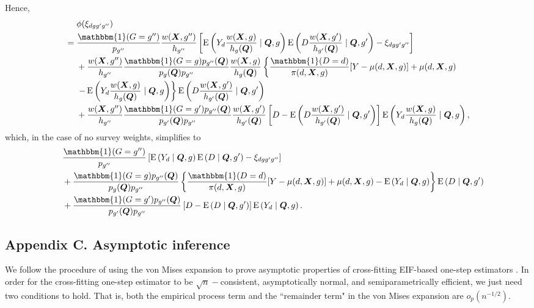 \documentclass[12pt,a4paper]{article}
\newcommand{\E}{\operatorname{E}}
\def\X{{\boldsymbol X}}
\def\Q{{\boldsymbol Q}}
\def\one{\mathbbm{1}}
\begin{document}
Hence,
\begin{align*}
    &\phantom{{}={}} \phi(\xi_{dgg'g''}) \\
    &= \frac{\one(G=g'')}{p_{g''}}\frac{w(\X,g'')}{h_{g''}} \left[ \E \left(Y_d \frac{w(\X,g)}{h_{g}(\Q)}  \mid \Q, g \right) \E \left(D \frac{w(\X,g')}{h_{g'}(\Q)} \mid \Q, g' \right) - \xi_{dgg'g''} \right] \\
    &\phantom{{}={}} + \frac{w(\X,g'')}{h_{g''}}  \frac{\one(G=g) p_{g''}(\Q)}{p_g(\Q)p_{g''}} \frac{w(\X,g)}{h_g(\Q)} \left\{ \frac{\one(D=d)}{\pi(d,\X,g)} [Y-\mu(d,\X,g)]+\mu(d,\X,g) \right. \\
    &\phantom{{}={}} \left. - \E \left(Y_d \frac{w(\X,g)}{h_g(\Q)} \mid \Q,g \right) \right\} \E \left(D \frac{w(\X,g')}{h_{g'}(\Q)} \mid \Q,g' \right) \\
    &\phantom{{}={}} + \frac{w(\X,g'')}{h_{g''}}  \frac{\one(G=g')p_{g''}(\Q)}{p_{g'}(\Q)p_{g''}} \frac{w(\X,g')}{h_{g'}(\Q)} \left[ D-\E \left(D \frac{w(\X,g')}{h_{g'}(\Q)} \mid \Q, g' \right) \right] \E\left( Y_d \frac{w(\X,g)}{h_g(\Q)} \mid \Q, g \right), 
\end{align*}
which, in the case of no survey weights, simplifies to 
\begin{align*}
    &\phantom{{}={}} \frac{\one(G=g'')}{p_{g''}} \left[ \E \left(Y_d \mid \Q, g \right) \E \left(D \mid \Q, g' \right) - \xi_{dgg'g''} \right] \\
    &\phantom{{}={}} + \frac{\one(G=g) p_{g''}(\Q)}{p_g(\Q)p_{g''}} \left\{ \frac{\one(D=d)}{\pi(d,\X,g)} [Y-\mu(d,\X,g)]+\mu(d,\X,g) - \E \left(Y_d \mid \Q,g \right) \right\} \E \left(D \mid \Q,g' \right) \\
    &\phantom{{}={}} + \frac{\one(G=g')p_{g''}(\Q)}{p_{g'}(\Q)p_{g''}} \left[ D-\E \left(D \mid \Q, g' \right) \right] \E\left( Y_d \mid \Q, g \right).
\end{align*}

\subsection*{Appendix C. Asymptotic inference}

We follow the procedure of using the von Mises expansion to prove asymptotic properties of cross-fitting EIF-based one-step estimators \citep{hines_demystifying_2022, kennedy_semiparametric_2022, fisher_visually_2021}. In order for the cross-fitting one-step estimator to be  $\sqrt{n}-$consistent, asymptotically normal, and semiparametrically efficient, we just need two conditions to hold. That is, both the empirical process term and the ``remainder term" in the von Mises expansion are $o_p(n^{-1/2})$.
\end{document}
